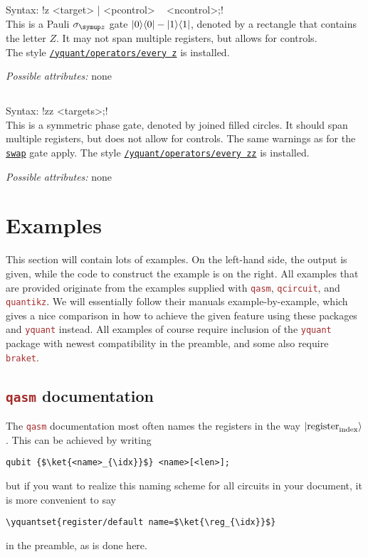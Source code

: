 \documentclass{scrartcl}
\makeatletter
\def\pkg#1{\textcolor{brown}{\texttt{#1}}}
\def\gate#1{\hyperref[gate:#1]{\texttt{#1}}}
\def\style#1{\hyperref[style:#1]{\texttt{#1}}}
\def\Yquant{\pkg{yquant}}
\def\ketbra#1#2{\ket{#1}\!\bra{#2}}
\newcommand*{\the@orig@section}{}
\let\the@orig@section=\section
\renewcommand*{\section}{%
   \clearpage%
   \the@orig@section%
}
\makeatother
\begin{document}
      \subsection{\texorpdfstring{}{z}}\label{gate:z}
         Syntax: \yquant!z <target> | <pcontrol> ~ <ncontrol>;! \\
         This is a Pauli $\sigma_{\symup z}$ gate $\ketbra00 - \ketbra11$, denoted by a rectangle that contains the letter $Z$.
         It may not span multiple registers, but allows for controls. \\
         The style \style{/yquant/operators/every z} is installed.

         \emph{Possible attributes:} none

      \subsection{\texorpdfstring{}{zz}}\label{gate:zz}
         Syntax: \yquant!zz <targets>;! \\
         This is a symmetric phase gate, denoted by joined filled circles.
         It should span multiple registers, but does not allow for controls.
         The same warnings as for the \gate{swap} gate apply.
         The style \style{/yquant/operators/every zz} is installed.

         \emph{Possible attributes:} none


   \section{Examples}\label{sec:examples}
      This section will contain lots of examples.
      On the left\hyp hand side, the output is given, while the code to construct the example is on the right.
      All examples that are provided originate from the examples supplied with \pkg{qasm}, \pkg{qcircuit}, and \pkg{quantikz}.
      We will essentially follow their manuals example\hyp by\hyp example, which gives a nice comparison in how to achieve the given feature using these packages and \Yquant{} instead.
      All examples of course require inclusion of the \Yquant{} package with newest compatibility in the preamble, and some also require \pkg{braket}.

      \subsection{\pkg{qasm} documentation}
      \begingroup%
         The \pkg{qasm} documentation most often names the registers in the way $\ket{\mathrm{register}_{\mathrm{index}}}$.
         This can be achieved by writing
         \begin{verbatim}
qubit {$\ket{<name>_{\idx}}$} <name>[<len>];
         \end{verbatim}
         but if you want to realize this naming scheme for all circuits in your document, it is more convenient to say
         \begin{verbatim}
\yquantset{register/default name=$\ket{\reg_{\idx}}$}
         \end{verbatim}
         in the preamble, as is done here.
\end{document}
